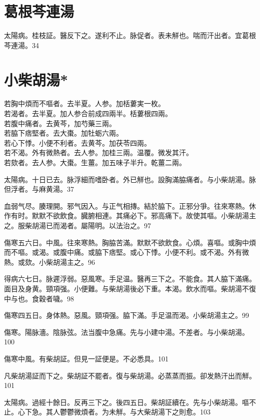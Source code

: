 \documentclass[12pt,twoside,UTF8,b5paper]{ctexbook}
\begin{document}
\section{葛根芩連湯}

太陽病。桂枝証。醫反下之。遂利不止。脉促者。表未觧也。喘而汗出者。宜葛根芩連湯。34

\section{小柴胡湯*}

若胸中煩而不嘔者。去半夏。人参。加栝蔞実一枚。\\
若渴者。去半夏。加人参合前成四兩半。栝蔞根四兩。\\
若腹中痛者。去黄芩，加芍藥三兩。\\
若脇下痞堅者。去大棗。加牡蛎六兩。\\
若心下悸。小便不利者。去黄芩。加茯苓四兩。\\
若不渴。外有微熱者。去人参。加桂三兩。温覆。微发其汗。\\
若欬者。去人参。大棗。生薑。加五味子半升。乾薑二兩。

太陽病。十日已去。脉浮細而嗜卧者。外已觧也。設胸滿脇痛者。与小柴胡湯。脉{但}浮者。与麻黄湯。37

血弱气尽。腠理開。邪气因入。与正气相摶。結於脇下。正邪分爭。往來寒熱。休作有时。默默不欲飲食。臓腑相連。其痛必下。邪高痛下。故使其嘔。小柴胡湯主之。服柴胡湯已而渴者。屬陽明。以法治之。97

傷寒五六日。中風。往來寒熱。胸脇苦滿。默默不欲飲食。心煩。喜嘔。或胸中煩而不嘔。或渴。或腹中痛。或脇下痞堅。或心下悸。小便不利。或不渴。外有微熱。或欬。小柴胡湯主之。96

得病六七日。脉遲浮弱。惡風寒。手足温。醫再三下之。不能食。其人脇下滿{痛}。面目及身黄。頸項强。小便難。与柴胡湯後必下重。本渴。飲水而嘔。柴胡{湯}不復中与也。食穀者噦。98

傷寒四五日。身{体}熱。惡風。頸項强。脇下滿。手足温而渴。小柴胡湯主之。99

傷寒。陽脉濇。陰脉弦。法当腹中急痛。先与小建中湯。不差者。与小柴胡湯。100

傷寒中風。有柴胡証。但見一証便是。不必悉具。101

凡柴胡湯証而下之。柴胡証不罷者。復与柴胡湯。必蒸蒸而振。卻发熱汗出而觧。101

太陽病。過經十餘日。反再三下之。後四五日。柴胡証續在。先与小柴胡湯。嘔不止。心下急。其人鬱鬱微煩者。为未觧。与大柴胡湯下之則愈。103
\end{document}
